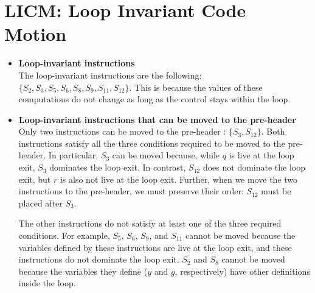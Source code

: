 \section{LICM: Loop Invariant Code Motion}

\begin{itemize}

\item{
    \textbf{Loop-invariant instructions}\\

    The loop-invariant instructions are the following: $\{ S_{2}, S_{3}, S_{5}, S_{6}, S_{8}, S_{9}, S_{11}, S_{12} \}$.
    This is because the values of these computations  do not change as long as the control stays within the  loop.

  }

  \item{
    \textbf{Loop-invariant instructions that can be moved to the pre-header}\\

    Only two instructions can be moved to the pre-header : $\{ S_{3}, S_{12} \}$. Both instructions satisfy all the three conditions required to be moved to the pre-header. In particular, $S_3$ can be moved because, while $q$ is live at the loop exit, $S_3$ dominates the loop exit. In contrast, $S_{12}$ does not dominate the loop exit, but $r$ is also not live at the loop exit. Further, when we move the two instructions to the pre-header, we must preserve their order: $S_{12}$ must be placed after $S_3$.

    The other instructions do not satisfy at least one of the three required conditions. For example, $S_5$, $S_6$, $S_9$, and $S_{11}$ cannot be moved because the variables defined by these instructions are live at the loop exit, and these instructions do not dominate the loop exit. $S_2$ and $S_8$ cannot be moved because the variables they define ($y$ and $g$, respectively) have other definitions inside the loop. %
    
  }

\end{itemize}
